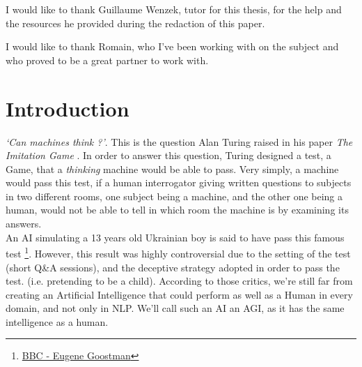 \documentclass[12pt]{article}
\begin{document}
I would like to thank Guillaume Wenzek, tutor for this thesis, for the help and
the resources he provided  during the redaction of this paper. \\

\bigskip


\noindent I would like to thank Romain, who I've been working with on the subject and who
proved to be a great partner to work with.\\


\pagebreak



\section*{Introduction}\label{introduction}

\smallskip

{\em \lq Can machines think ?\rq }. This is the question Alan Turing raised in
his paper {\em The Imitation Game} \cite{Turing}. In order to answer this
question, Turing designed a test, a Game, that a {\em thinking} machine would be
able to pass. Very simply, a machine would pass this test, if a human
interrogator giving written questions to subjects in two different rooms, one
subject being a machine, and the other one being a human, would not be able to
tell in which room the machine is by examining its answers. \\

An AI simulating a 13 years old Ukrainian boy is said to have pass this famous
test \footnote{\href{http://www.bbc.com/news/technology-27762088} {BBC - Eugene
Goostman}}. However, this result was highly controversial due to the setting of
the test (short Q\&A sessions), and the deceptive strategy adopted in order to
pass the test. (i.e. pretending to be a child). According to those critics,
we're still far from creating an Artificial Intelligence that could perform as
well as a Human in every domain, and not only in \gls{NLP}. We'll call such an
AI an \gls{AGI}, as it has the same intelligence as a human. \\
\end{document}
